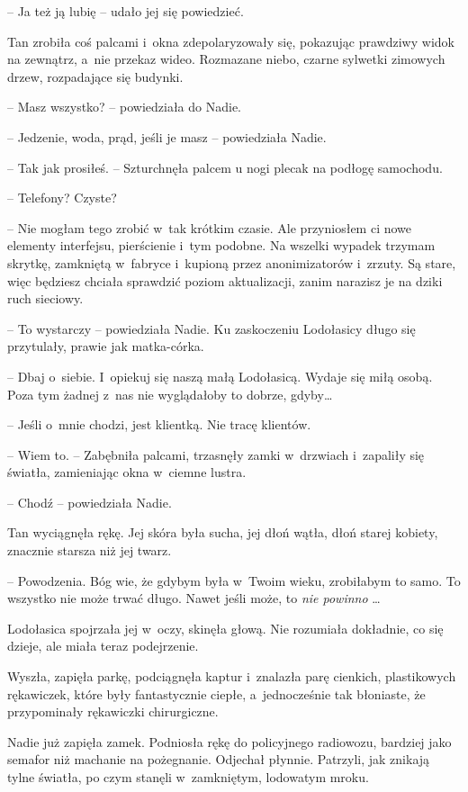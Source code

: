 \documentclass[oneside,polish,11pt,sfheadings]{mwbk}
\begin{document}
-- Ja też ją lubię -- udało jej się powiedzieć.

Tan zrobiła coś palcami i~okna zdepolaryzowały się, pokazując prawdziwy
widok na zewnątrz, a~nie przekaz wideo. Rozmazane niebo, czarne sylwetki
zimowych drzew, rozpadające się budynki.

-- Masz wszystko? -- powiedziała do Nadie.

-- Jedzenie, woda, prąd, jeśli je masz -- powiedziała Nadie.

-- Tak jak prosiłeś. -- Szturchnęła palcem u nogi plecak na podłogę
samochodu.

-- Telefony? Czyste?

-- Nie mogłam tego zrobić w~tak krótkim czasie. Ale przyniosłem ci nowe
elementy interfejsu, pierścienie i~tym podobne. Na wszelki wypadek
trzymam skrytkę, zamkniętą w~fabryce i~kupioną przez anonimizatorów i~zrzuty. Są stare, więc będziesz chciała sprawdzić poziom aktualizacji,
zanim narazisz je na dziki ruch sieciowy.

-- To wystarczy -- powiedziała Nadie. Ku zaskoczeniu Lodołasicy długo się
przytulały, prawie jak matka-córka.

-- Dbaj o~siebie. I~opiekuj się naszą małą Lodołasicą. Wydaje się miłą
osobą. Poza tym żadnej z~nas nie wyglądałoby to dobrze, gdyby\ldots 

-- Jeśli o~mnie chodzi, jest klientką. Nie tracę klientów.

-- Wiem to. -- Zabębniła palcami, trzasnęły zamki w~drzwiach i~zapaliły
się światła, zamieniając okna w~ciemne lustra.

-- Chodź -- powiedziała Nadie.

Tan wyciągnęła rękę. Jej skóra była sucha, jej dłoń wątła, dłoń starej
kobiety, znacznie starsza niż jej twarz. 

-- Powodzenia. Bóg wie, że
gdybym była w~Twoim wieku, zrobiłabym to samo. To wszystko nie może
trwać długo. Nawet jeśli może, to \textit{nie powinno }\ldots 

Lodołasica spojrzała jej w~oczy, skinęła głową. Nie rozumiała dokładnie,
co się dzieje, ale miała teraz podejrzenie.

Wyszła, zapięła parkę, podciągnęła kaptur i~znalazła parę cienkich,
plastikowych rękawiczek, które były fantastycznie ciepłe, a~jednocześnie
tak błoniaste, że przypominały rękawiczki chirurgiczne.

Nadie już zapięła zamek. Podniosła rękę do policyjnego radiowozu,
bardziej jako semafor niż machanie na pożegnanie. Odjechał płynnie.
Patrzyli, jak znikają tylne światła, po czym stanęli w~zamkniętym,
lodowatym mroku.
\end{document}
